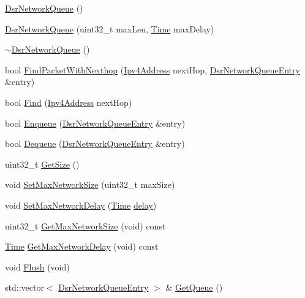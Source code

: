 \begin{DoxyCompactItemize}
\item 
\hyperlink{classns3_1_1dsr_1_1DsrNetworkQueue_a481d1d66cf8972ba3bf3fcafce8702cc}{Dsr\+Network\+Queue} ()
\item 
\hyperlink{classns3_1_1dsr_1_1DsrNetworkQueue_a343a53dd5e251e4c0fbab47fe3405c2f}{Dsr\+Network\+Queue} (uint32\+\_\+t max\+Len, \hyperlink{classns3_1_1Time}{Time} max\+Delay)
\item 
\hyperlink{classns3_1_1dsr_1_1DsrNetworkQueue_af1262dba5a398f068b8c86c494702964}{$\sim$\+Dsr\+Network\+Queue} ()
\item 
bool \hyperlink{classns3_1_1dsr_1_1DsrNetworkQueue_a1aa320df338c0f95da5f0942633c42ef}{Find\+Packet\+With\+Nexthop} (\hyperlink{classns3_1_1Ipv4Address}{Ipv4\+Address} next\+Hop, \hyperlink{classns3_1_1dsr_1_1DsrNetworkQueueEntry}{Dsr\+Network\+Queue\+Entry} \&entry)
\item 
bool \hyperlink{classns3_1_1dsr_1_1DsrNetworkQueue_ab4a90bd328770ae2d8327a1e7d7d9b08}{Find} (\hyperlink{classns3_1_1Ipv4Address}{Ipv4\+Address} next\+Hop)
\item 
bool \hyperlink{classns3_1_1dsr_1_1DsrNetworkQueue_a308594b0e71669719da1df485b039e06}{Enqueue} (\hyperlink{classns3_1_1dsr_1_1DsrNetworkQueueEntry}{Dsr\+Network\+Queue\+Entry} \&entry)
\item 
bool \hyperlink{classns3_1_1dsr_1_1DsrNetworkQueue_afc773cdde24118ae0e7fb2529e90bfa0}{Dequeue} (\hyperlink{classns3_1_1dsr_1_1DsrNetworkQueueEntry}{Dsr\+Network\+Queue\+Entry} \&entry)
\item 
uint32\+\_\+t \hyperlink{classns3_1_1dsr_1_1DsrNetworkQueue_a1aeab7c9e0d8b7037bfce57cd30d662f}{Get\+Size} ()
\item 
void \hyperlink{classns3_1_1dsr_1_1DsrNetworkQueue_a9db2900ceffc8e9b012a5dfa61aae849}{Set\+Max\+Network\+Size} (uint32\+\_\+t max\+Size)
\item 
void \hyperlink{classns3_1_1dsr_1_1DsrNetworkQueue_a1bc6496d849e30a8f6adde0fdd78a98b}{Set\+Max\+Network\+Delay} (\hyperlink{classns3_1_1Time}{Time} \hyperlink{mmwave_2model_2fading-traces_2fading__trace__generator_8m_a7964e6aa8f61a9d28973c8267a606ad8}{delay})
\item 
uint32\+\_\+t \hyperlink{classns3_1_1dsr_1_1DsrNetworkQueue_af98088108c182734b7f1c1ab39c47dc7}{Get\+Max\+Network\+Size} (void) const 
\item 
\hyperlink{classns3_1_1Time}{Time} \hyperlink{classns3_1_1dsr_1_1DsrNetworkQueue_adbbd42dc7e72ade88048ce770ccf77f7}{Get\+Max\+Network\+Delay} (void) const 
\item 
void \hyperlink{classns3_1_1dsr_1_1DsrNetworkQueue_aed9e821b632a9c71d2d33948dfa2f5d8}{Flush} (void)
\item 
std\+::vector$<$ \hyperlink{classns3_1_1dsr_1_1DsrNetworkQueueEntry}{Dsr\+Network\+Queue\+Entry} $>$ \& \hyperlink{classns3_1_1dsr_1_1DsrNetworkQueue_a0c366a125a2efea1f897f6f70c8d92d4}{Get\+Queue} ()
\end{DoxyCompactItemize}

